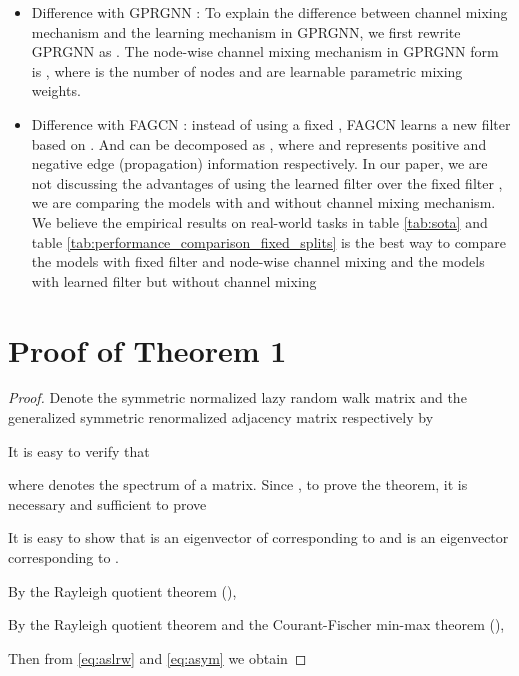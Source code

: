 \documentclass{article}
\newcommand{\0}{{\boldsymbol{0}}}
\newcommand{\6}{{\partial}}
\newcommand{\8}{{\infty}}
\newcommand{\4}{{\nabla}}
\begin{document}
\begin{itemize}
    \item Difference with GPRGNN \cite{chien2021adaptive}: To explain the difference between channel mixing mechanism and the learning mechanism in GPRGNN, we first rewrite GPRGNN as . The node-wise channel mixing mechanism in GPRGNN form is , where  is the number of nodes and  are learnable parametric mixing weights.

    \item Difference with FAGCN \cite{bo2021beyond}: instead of using a fixed , FAGCN learns a new filter  based on . And  can be decomposed as , where  and  represents positive and negative edge (propagation) information respectively. In our paper, we are not discussing the advantages of using the learned filter  over the fixed filter , we are comparing the models with and without channel mixing mechanism. We believe the empirical results on real-world tasks in table \ref{tab:sota} and table \ref{tab:performance_comparison_fixed_splits} is the best way to compare the models with fixed filter and node-wise channel mixing and the models with learned filter but without channel mixing
\end{itemize}


\iffalse
\section{Proof of Theorem 1}
\label{apprndix:proof_eigengap}
\begin{proof}
Denote the symmetric normalized lazy random walk matrix
and the generalized symmetric renormalized adjacency matrix respectively by


It is easy to verify that 

where  denotes the spectrum of a matrix.
Since , 
to prove the theorem, it is necessary and sufficient to prove

It is easy to show that  is an eigenvector of 
corresponding to 
and  is an eigenvector 
corresponding to . 


By the Rayleigh quotient theorem (\citealp[Sec. 4.3]{HorJ13}),

By the Rayleigh quotient theorem and the Courant-Fischer min-max theorem (\citealp[Sec. 4.3]{HorJ13}), 

Then from \eqref{eq:aslrw} and \eqref{eq:asym} we obtain

\iffalse

where ,  is nonsingular and . Then

To prove , for any  , consider the following difference

Since the denominator is always positive for any  and , we only consider the numerator,

any  and 

Then the above formula is smaller or equal to

\fi
\end{proof}
\end{document}
